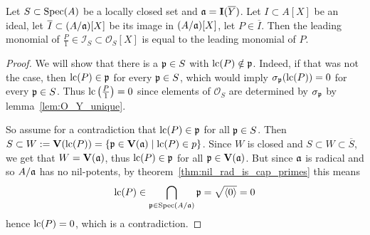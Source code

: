 \begin{lemma}\label{lem:embed_preserves_LM}
  Let $S \subset \operatorname{Spec}(A)$ be a locally closed set and $\mathfrak{a} = \operatorname{\mathbf I}(\overline Y)$. Let $I \subset A[X]$ be an ideal, let $\overline I \subset (A/\mathfrak{a})[X]$ be its image in $(A/\mathfrak{a})[X]$, let $P \in \overline I$. Then the leading monomial of $\frac P 1 \in \mathcal I_{S} \subset \mathcal O_{S}[X]$ is equal to the leading monomial of $P$.
\end{lemma}
\begin{proof}
  We will show that there is a $\mathfrak p \in S$ with $\operatorname{lc}(P) \notin \mathfrak p$. Indeed, if that was not the case, then $\operatorname{lc}(P) \in \mathfrak p$ for every $\mathfrak p \in S$, which would imply $\sigma_{\mathfrak p}(\operatorname{lc}(P)) = 0$ for every $\mathfrak p \in S$. Thus $\operatorname{lc}\left(\frac P 1\right) = 0$ since elements of $\mathcal O_{S}$ are determined by $\sigma_{\mathfrak p}$ by lemma~\ref{lem:O_Y_unique}.

  So assume for a contradiction that $\operatorname{lc}(P) \in \mathfrak p$ for all $\mathfrak p \in S$. Then $S \subset W := \operatorname{\mathbf V}(\operatorname{lc}(P)) = \{\mathfrak p \in \operatorname{\mathbf V}(\mathfrak{a}) \mid \operatorname{lc}(P) \in p\}$. Since $W$ is closed and $S \subset W \subset \overline S$, we get that $W = \operatorname{\mathbf V}(\mathfrak{a})$, thus $\operatorname{lc}(P) \in \mathfrak p $ for all $\mathfrak p \in \operatorname{\mathbf V}(\mathfrak{a})$. But since $\mathfrak{a}$ is radical and so $A/\mathfrak{a}$ has no nil-potents, by theorem~\ref{thm:nil_rad_is_cap_primes} this means
  \[\operatorname{lc}(P) \in \bigcap_{\mathfrak p \in \operatorname{Spec}(A/\mathfrak{a})} \mathfrak p = \sqrt{\langle 0 \rangle} = 0\]
  hence $\operatorname{lc}(P) = 0$, which is a contradiction.
\end{proof}



